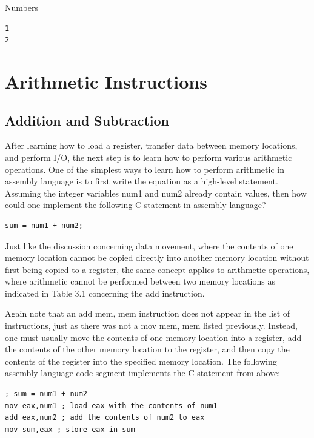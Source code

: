 \documentclass[10pt]{book}
\begin{document}
Numbers

\begin{verbatim}
1
2
\end{verbatim}

\chapter{Arithmetic Instructions}

\section{Addition and Subtraction}
After learning how to load a register, transfer data between memory locations, and perform I/O, the next step is to learn how to perform various arithmetic operations. One of the simplest ways to learn how to perform arithmetic in assembly language is to first write the equation as a high-level statement. Assuming the integer variables num1 and num2 already contain values, then how could one implement the following C statement in assembly language?

\begin{verbatim}
sum = num1 + num2;
\end{verbatim}

Just like the discussion concerning data movement, where the contents of one memory location cannot be copied directly into another memory location without first being copied to a register, the same concept applies to arithmetic operations, where arithmetic cannot be performed between two memory locations as indicated in Table 3.1 concerning the add instruction.

Again note that an add mem, mem instruction does not appear in the list of instructions, just as there was not a mov mem, mem listed previously. Instead, one must usually move the contents of one memory location into a register, add the contents of the other memory location to the register, and then copy the contents of the register into the specified memory location. The following assembly language code segment implements the C statement from above:

\begin{verbatim}
; sum = num1 + num2
mov eax,num1 ; load eax with the contents of num1
add eax,num2 ; add the contents of num2 to eax
mov sum,eax ; store eax in sum
\end{verbatim}
\end{document}
